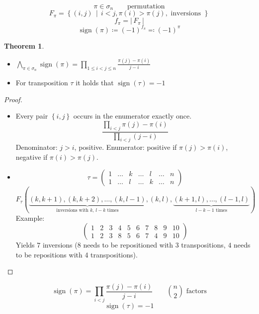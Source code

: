 \documentclass[a4paper,landscape,twocolumn]{article}
\newcommand\set[1]{\left\{#1\right\}}
\newcommand\setdef[2]{\left\{#1\,\middle|\,#2\right\}}
\newcommand\card[1]{\left|\,#1\,\right|}
\theoremstyle{definition}
\newtheorem{theorem}{Theorem}
\DeclareMathOperator\sign{sign}
\begin{document}
\[ \pi \in \sigma_n \qquad \text{permutation} \]
\[ F_\pi = \setdef{(i,j)}{i < j, \pi(i) > \pi(j), \text{ inversions }} \]
\[ f_\pi = \card{F_\pi} \]
\[ \sign(\pi) \coloneqq (-1)^{f_\pi} \eqqcolon (-1)^\pi \]

\begin{theorem}
  \label{satz-7.16}
  \begin{itemize}
    \item $\bigwedge_{\pi \in \sigma_n} \sign(\pi) = \prod_{1 \leq i < j \leq n} \frac{\pi(j) - \pi(i)}{j - i}$
    \item For transposition $\tau$ it holds that $\sign(\tau) = -1$
  \end{itemize}
\end{theorem}
\begin{proof}
  \begin{itemize}
    \item
      Every pair $\set{i,j}$ occurs in the enumerator exactly once.
      \[ \frac{\prod_{i<j} \pi(j) - \pi(i)}{\prod_{i<j} (j - i)} \]
      Denominator: $j > i$, positive.
      Enumerator: positive if $\pi(j) > \pi(i)$, negative if $\pi(i) > \pi(j)$.
    \item
      \[
        \tau =
        \begin{pmatrix}
          1 & \ldots & k & \ldots & l & \ldots & n \\
          1 & \ldots & l & \ldots & k & \ldots & n
        \end{pmatrix}
      \] \[
        F_\tau(\underbrace{(k, k + 1), (k, k + 2), \ldots, (k, l-1)}_{\text{inversions with $k$, $l-k$ times}},
        (k,l), \underbrace{(k+1, l), \ldots, (l - 1, l)}_{l-k-1 \text{ times}})
      \]
      Example:
      \[
        \begin{pmatrix}
          1 & 2 & 3 & 4 & 5 & 6 & 7 & 8 & 9 & 10 \\
          1 & 2 & 3 & 8 & 5 & 6 & 7 & 4 & 9 & 10
        \end{pmatrix}
      \]
      Yields $7$ inversions ($8$ needs to be repositioned with 3 transpositions, $4$ needs to be repositions with 4 transpositions).
  \end{itemize}
\end{proof}

\[ \sign(\pi) = \prod_{i < j} \frac{\pi(j) - \pi(i)}{j - i} \qquad {n \choose 2} \text{ factors} \]
\[ \sign(\tau) = -1 \]
\end{document}
